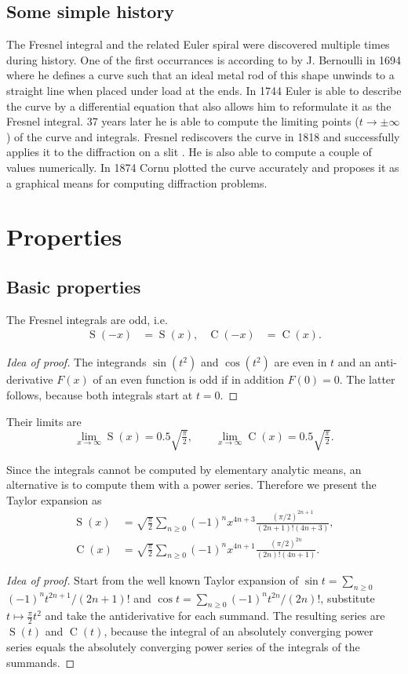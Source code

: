 \documentclass[12pt]{article}
\DeclareMathOperator\Cee{C} %
\def\d#1{{\,\ud#1\,}}
\DeclareMathOperator\eS{S} %
\begin{document}
\subsection{Some simple history}
The Fresnel integral and the related Euler spiral were discovered multiple times during history.  One of the first occurrances is according to \cite{Lev08} by J. Bernoulli in 1694 where he defines a curve such that an ideal metal rod of this shape unwinds to a straight line when placed under load at the ends.  In 1744 Euler is able to describe the curve by a differential equation that also allows him to reformulate it as the Fresnel integral.  37 years later he is able to compute the limiting points ($t\to\pm\infty$) of the curve and integrals.  Fresnel rediscovers the curve in 1818 and successfully applies it to the diffraction on a slit \cite{Lev08}.  He is also able to compute a couple of values numerically.  In 1874 Cornu plotted the curve accurately and proposes it as a graphical means for computing diffraction problems.


\section{Properties}
\subsection{Basic properties}
The Fresnel integrals are odd, i.e.
\begin{align*}
	\eS(-x) &= \eS(x), & \Cee(-x) &= \Cee(x).
\end{align*}
\begin{proof}[Idea of proof]  The integrands $\sin(t^2)$ and $\cos(t^2)$ are even in $t$ and an anti-derivative $F(x)$ of an even function is odd if in addition $F(0)=0$.  The latter follows, because both integrals start at $t=0$.
\end{proof}

Their limits are
\[  \lim_{x\to\infty} \eS(x) = 0.5\sqrt{\tfrac\pi2},\qquad  \lim_{x\to\infty} \Cee(x) = 0.5\sqrt{\tfrac\pi2}.
\]

Since the integrals cannot be computed by elementary analytic means, an alternative is to compute them with a power series.  Therefore we present the Taylor expansion as
\begin{align*}
  \eS(x) &= \sqrt{\frac\pi2}\sum_{n\ge0} (-1)^nx^{4n+3}\frac{(\pi/2)^{2n+1}}{(2n+1)!(4n+3)}, \\
  \Cee(x) &= \sqrt{\frac\pi2}\sum_{n\ge0} (-1)^nx^{4n+1}\frac{(\pi/2)^{2n}}{(2n)!(4n+1)}.
\end{align*}
\begin{proof}[Idea of proof]  Start from the well known Taylor expansion of $\sin t = \sum_{n\ge0}$ $(-1)^n t^{2n+1}/(2n+1)!$ and $\cos t = \sum_{n\ge0} (-1)^nt^{2n}/(2n)!$, substitute $t\mapsto \tfrac\pi2 t^2$ and take the antiderivative for each summand.  The resulting series are $\eS(t)$ and $\Cee(t)$, because the integral of an absolutely converging power series equals the absolutely converging power series of the integrals of the summands.
\end{proof}
\end{document}
